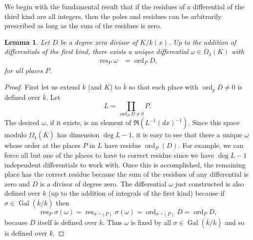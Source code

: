 \documentclass[12pt,reqno]{amsart}
\numberwithin{equation}{section}
\newtheorem{lemma}[theorem]{Lemma}
\newcommand{\op}[1]  { \operatorname{ #1 }}
\newcommand{\goR}[0]  { \mathfrak{R}}
\begin{document}
We begin with the fundamental result that if the residues of a differential of the third kind are all integers, then the poles and residues can be arbitrarily prescribed as long as the sum of the residues is zero.

\begin{lemma}
\label{lemma_construct3}
 Let $D$ be a degree zero divisor of $K/k(x)$. Up to the addition of differentials of the first kind, there exists a unique differential $\omega \in \Omega_3(K)$ with
\begin{align*}
\op{res}_{P} \omega &= \op{ord}_P D \text{,}
\end{align*}
for all places $P$.
\end{lemma}
\begin{proof}
First let us extend $k$ (and $K$) to $\overline{k}$ so that each place with $\op{ord}_p D \ne 0$ is defined over $\overline{k}$. Let
\begin{equation*}
 L = \prod_{\op{ord}_P D \ne 0} P\text{.}
\end{equation*}
The desired $\omega$, if it exists, is an element of $\goR(L^{-1} (dx)^{-1})$. Since this space modulo $\Omega_1(\overline{K})$ has dimension $\deg{L}-1$, it is easy to see that there a unique $\omega$ whose order at the places $P$ in $L$ have residue $\op{ord}_P(D)$. For example, we can force all but one of the places to have to correct residue since we have $\deg{L}-1$ independent differentials to work with. Once this is accomplished, the remaining place has the correct residue because the sum of the residues of any differential is zero and $D$ is a divisor of degree zero. The differential $\omega$ just constructed is also defined over $k$ (up to the addition of integrals of the first kind) because if $\sigma \in \op{Gal}(\overline{k}/k)$ then
\begin{equation*}
\op{res}_{P} \sigma(\omega) = \op{res}_{\sigma^{-1}(P)} \sigma(\omega) = \op{ord}_{\sigma^{-1}(P)}D = \op{ord}_P D \text{,}
\end{equation*}
because $D$ itself is defined over $k$. Thus $\omega$ is fixed by all $\sigma \in \op{Gal}(\overline{k}/k)$ and so is defined over $k$.
\end{proof}
\end{document}
